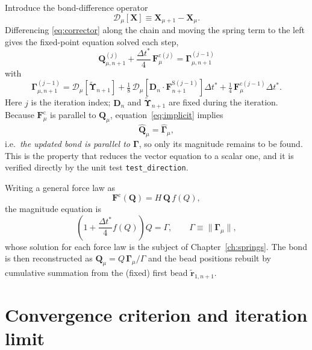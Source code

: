 \documentclass[11pt,a4paper]{report}
\newcommand{\D}{\bm{D}}
\newcommand{\Q}{\bm{Q}}
\newcommand{\dt}{\Delta t^{*}}
\newcommand{\code}[1]{\texttt{\seqsplitcode{#1}}}
\newcommand{\seqsplitcode}[1]{#1}
\begin{document}
Introduce the bond-difference operator
\begin{equation}
  \mathcal{D}_\mu[\bm{X}] \equiv \bm{X}_{\mu+1} - \bm{X}_{\mu}.
\end{equation}
Differencing \eqref{eq:corrector} along the chain and moving the spring term to
the left gives the fixed-point equation solved each step,
\begin{equation}
  \boxed{\;
  \Q^{(j)}_{\mu,n+1} + \frac{\dt}{4}\,\bm{F}^{\mathrm{c}(j)}_{\mu}
    = \bm{\Gamma}^{(j-1)}_{\mu,n+1}\;}
  \label{eq:implicit}
\end{equation}
with
\begin{equation}
  \bm{\Gamma}^{(j-1)}_{\mu,n+1}
    = \mathcal{D}_\mu\!\left[\tilde{\bm{\Upsilon}}_{n+1}\right]
    + \tfrac{1}{8}\,\mathcal{D}_\mu\!\left[\D_n\cdot\bm{F}^{\mathrm{S}(j-1)}_{n+1}\right]\dt
    + \tfrac{1}{4}\,\bm{F}^{\mathrm{c}(j-1)}_{\mu}\dt .
  \label{eq:gamma}
\end{equation}
Here $j$ is the iteration index; $\D_n$ and $\tilde{\bm{\Upsilon}}_{n+1}$ are
fixed during the iteration. Because $\bm{F}^{\mathrm{c}}_\mu$ is parallel to
$\Q_\mu$, equation~\eqref{eq:implicit} implies
\begin{equation}
  \hat{\Q}_{\mu} = \hat{\bm{\Gamma}}_{\mu},
\end{equation}
i.e.\ \emph{the updated bond is parallel to $\bm{\Gamma}$}, so only its magnitude
remains to be found. This is the property that reduces the vector equation to a
scalar one, and it is verified directly by the unit test \code{test\_direction}.

Writing a general force law as
\begin{equation}
  \bm{F}^{\mathrm{c}}(\Q) = H\,\Q\,f(Q),
  \label{eq:general-force-law}
\end{equation}
the magnitude equation is
\begin{equation}
  \left(1 + \frac{\dt}{4}f(Q)\right) Q = \Gamma,
  \qquad \Gamma \equiv \|\bm{\Gamma}_\mu\| ,
  \label{eq:magnitude}
\end{equation}
whose solution for each force law is the subject of Chapter~\ref{ch:springs}.
The bond is then reconstructed as $\Q_\mu = Q\,\bm{\Gamma}_\mu/\Gamma$ and the
bead positions rebuilt by cumulative summation from the (fixed) first bead
$\tilde{\bm{r}}_{1,n+1}$.

\section{Convergence criterion and iteration limit}
\end{document}
